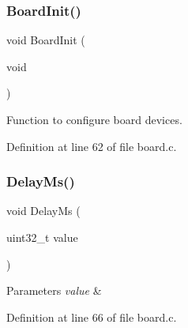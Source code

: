 \subsubsection{\texorpdfstring{Board\+Init()}{BoardInit()}}
{\footnotesize\ttfamily void Board\+Init (\begin{DoxyParamCaption}\item[{void}]{ }\end{DoxyParamCaption})}



Function to configure board devices. 



Definition at line 62 of file board.\+c.

\mbox{\label{group__boards_gace922d758774792e0573b7c568fe2a3f}} 
\subsubsection{\texorpdfstring{Delay\+Ms()}{DelayMs()}}
{\footnotesize\ttfamily void Delay\+Ms (\begin{DoxyParamCaption}\item[{uint32\+\_\+t}]{value }\end{DoxyParamCaption})}


\begin{DoxyParams}{Parameters}
{\em value} & \\
\hline
\end{DoxyParams}


Definition at line 66 of file board.\+c.


